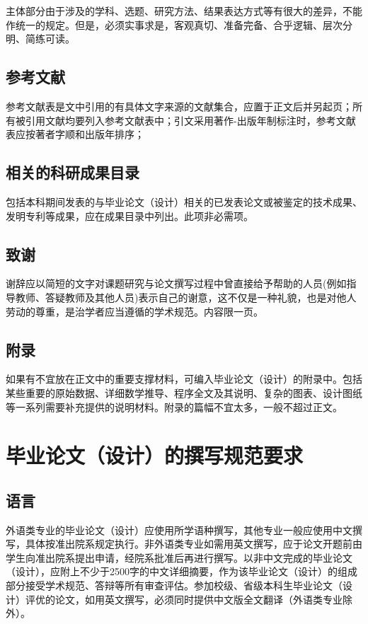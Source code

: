 主体部分由于涉及的学科、选题、研究方法、结果表达方式等有很大的差异，不能作统一的规定。但是，必须实事求是，客观真切、准备完备、合乎逻辑、层次分明、简练可读。

\subsection{参考文献}
参考文献表是文中引用的有具体文字来源的文献集合，应置于正文后并另起页；所有被引用文献均要列入参考文献表中；引文采用著作-出版年制标注时，参考文献表应按著者字顺和出版年排序；

\subsection{相关的科研成果目录}
包括本科期间发表的与毕业论文（设计）相关的已发表论文或被鉴定的技术成果、发明专利等成果，应在成果目录中列出。此项非必需项。

\subsection{致谢}
谢辞应以简短的文字对课题研究与论文撰写过程中曾直接给予帮助的人员(例如指导教师、答疑教师及其他人员)表示自己的谢意，这不仅是一种礼貌，也是对他人劳动的尊重，是治学者应当遵循的学术规范。内容限一页。

\subsection{附录}
如果有不宜放在正文中的重要支撑材料，可编入毕业论文（设计）的附录中。包括某些重要的原始数据、详细数学推导、程序全文及其说明、复杂的图表、设计图纸等一系列需要补充提供的说明材料。附录的篇幅不宜太多，一般不超过正文。

\section{毕业论文（设计）的撰写规范要求}
\subsection{语言}
外语类专业的毕业论文（设计）应使用所学语种撰写，其他专业一般应使用中文撰写，具体按准出院系规定执行。非外语类专业如需用英文撰写，应于论文开题前由学生向准出院系提出申请，经院系批准后再进行撰写。以非中文完成的毕业论文（设计），应附上不少于2500字的中文详细摘要，作为该毕业论文（设计）的组成部分接受学术规范、答辩等所有审查评估。参加校级、省级本科生毕业论文（设计）评优的论文，如用英文撰写，必须同时提供中文版全文翻译（外语类专业除外）。

